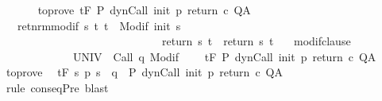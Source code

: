 \begin{isabellebody}
\ \ \ %
\isanewline
\ \ \ to{\isacharunderscore}prove{\isacharcolon}\ {\isachardoublequoteopen}{\isasymGamma}{\isacharcomma}{\isasymTheta}{\isasymturnstile}\isactrlsub t\isactrlbsub {\isacharslash}F\isactrlesub \ P{\isacharprime}\ {\isacharparenleft}dynCall\ init\ p\ return{\isacharprime}\ c{\isacharparenright}\ Q{\isacharcomma}A{\isachardoublequoteclose}\isanewline
\ \ \ ret{\isacharunderscore}nrm{\isacharunderscore}modif{\isacharcolon}\ {\isachardoublequoteopen}{\isasymforall}s\ t{\isachardot}\ t\ {\isasymin}\ {\isacharparenleft}Modif\ {\isacharparenleft}init\ s{\isacharparenright}{\isacharparenright}\ \isanewline
\ \ \ \ \ \ \ \ \ \ \ \ \ \ \ \ \ \ \ \ \ \ \ \ \ \ \ \ {\isasymlongrightarrow}\ return{\isacharprime}\ s\ t\ {\isacharequal}\ return\ s\ t{\isachardoublequoteclose}\isanewline
\ \ \ modif{\isacharunderscore}clause{\isacharcolon}\ \isanewline
\ \ \ \ \ \ \ \ \ \ \ \ {\isachardoublequoteopen}{\isasymforall}{\isasymsigma}{\isachardot}\ {\isasymGamma}{\isacharcomma}{\isasymTheta}{\isasymturnstile}\isactrlbsub {\isacharslash}UNIV\isactrlesub \ {\isacharbraceleft}{\isasymsigma}{\isacharbraceright}\ {\isacharparenleft}Call\ q{\isacharparenright}\ {\isacharparenleft}Modif\ {\isasymsigma}{\isacharparenright}{\isacharcomma}{\isacharbraceleft}{\isacharbraceright}{\isachardoublequoteclose}\isanewline
\ \ \ {\isachardoublequoteopen}{\isasymGamma}{\isacharcomma}{\isasymTheta}{\isasymturnstile}\isactrlsub t\isactrlbsub {\isacharslash}F\isactrlesub \ P\ {\isacharparenleft}dynCall\ init\ p\ return\ c{\isacharparenright}\ Q{\isacharcomma}A{\isachardoublequoteclose}\isanewline
%
\isadelimproof
%
\endisadelimproof
%
\isatagproof
{}\isamarkupfalse%
\ {\isacharminus}\isanewline
\ \ \isamarkupfalse%
\ to{\isacharunderscore}prove\ \isamarkupfalse%
\ {\isachardoublequoteopen}{\isasymGamma}{\isacharcomma}{\isasymTheta}{\isasymturnstile}\isactrlsub t\isactrlbsub {\isacharslash}F\isactrlesub \ {\isacharparenleft}{\isacharbraceleft}s{\isachardot}\ p\ s\ {\isacharequal}\ q{\isacharbraceright}\ {\isasyminter}\ P{\isacharprime}{\isacharparenright}\ {\isacharparenleft}dynCall\ init\ p\ return{\isacharprime}\ c{\isacharparenright}\ Q{\isacharcomma}A{\isachardoublequoteclose}\isanewline
\ \ \ \ \isamarkupfalse%
\ {\isacharparenleft}rule\ conseqPre{\isacharparenright}\ blast\isanewline

\end{isabellebody}
